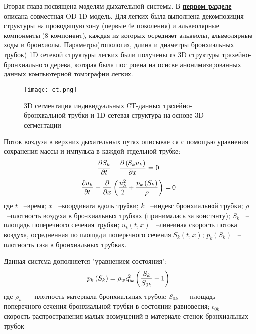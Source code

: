Вторая глава посвящена моделям дыхательной системы. В \underline{\textbf{первом разделе}} описана совместная OD-1D модель. Для легких была выполнена декомпозиция структуры на проводящую зону (первые 4е поколения) и альвеолярные компоненты (8 компонент), каждая из которых осредняет альвеолы, альвеолярные ходы и бронхиолы. Параметры(топология, длина и диаметры бронхиальных трубок) 1D сетевой структуры легких были получены из 3D структуры трахейно-бронхиального дерева, которая была построена на основе анонимизированных данных компьютерной томографии легких. 
\begin{figure}[!ht]
	\centering
	\texttt{[image: ct.png]}
	\caption{3D сегментация индивидуальных CT-данных трахейно-бронхиальной трубки и 1D сетевая структура на основе 3D сегментации} 
	\label{s2vechart}
\end{figure}
Поток воздуха в верхних дыхательных путях описывается с помощью уравнения сохранения массы и импульса в каждой отдельной трубке:
\begin{equation} 
\frac{\partial S_{k} }{\partial t} +\frac{\partial \left(S_{k} u_{k} \right)}{\partial x} =0 \notag
\end{equation} 
\begin{equation} 
\frac{\partial u_{k} }{\partial t} +\frac{\partial }{\partial x} \left(\frac{u_{k}^{2} }{2} +\frac{p_{k} \left(S_{k} \right)}{\rho } \right)=0 \notag  
\end{equation} 
где $t$ ~--время; $x$ ~--координата вдоль трубки; $k$ ~--индекс бронхиальной трубки; $\rho $ ~--плотность воздуха в бронхиальных трубках (принималась за константу); $S_{k} $ ~--площадь поперечного сечения трубки; $u_{k} \left(t,x\right)$ ~--линейная скорость потока воздуха, осредненная по площади поперечного сечения $S_{k} \left(t,x\right)$; $p_{k} \left(S_{k} \right)$ ~--плотность газа в бронхиальных трубках. 

Данная система дополняется "уравнением состояния":
\begin{equation} 
p_{k} \left(S_{k} \right)=\rho _{w} c_{0k}^{2} \left(\frac{S_{k} }{S_{0k} } -1\right)\notag  
\end{equation} 
где $\rho _{w} $ ~-- плотность материала бронхиальных трубок; $S_{0k} $ ~-- площадь поперечного сечения бронхиальной трубки в состоянии равновесия; $c_{0k} $ ~-- скорость распространения малых возмущений в материале стенок бронхиальных трубок

